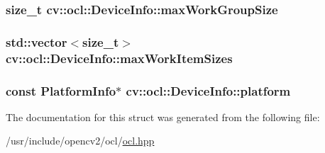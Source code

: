 \hypertarget{structcv_1_1ocl_1_1DeviceInfo_a269ef58aa2c06838ce1b7b1c12ef743f}{
\subsubsection[{max\-Work\-Group\-Size}]{\setlength{\rightskip}{0pt plus 5cm}size\-\_\-t cv\-::ocl\-::\-Device\-Info\-::max\-Work\-Group\-Size}}\label{structcv_1_1ocl_1_1DeviceInfo_a269ef58aa2c06838ce1b7b1c12ef743f}
\hypertarget{structcv_1_1ocl_1_1DeviceInfo_a553c8db901e05768180ce01c504bb99b}{
\subsubsection[{max\-Work\-Item\-Sizes}]{\setlength{\rightskip}{0pt plus 5cm}std\-::vector$<$size\-\_\-t$>$ cv\-::ocl\-::\-Device\-Info\-::max\-Work\-Item\-Sizes}}\label{structcv_1_1ocl_1_1DeviceInfo_a553c8db901e05768180ce01c504bb99b}
\hypertarget{structcv_1_1ocl_1_1DeviceInfo_a14a6fc835e65e05272ea17b9123785ca}{
\subsubsection[{platform}]{\setlength{\rightskip}{0pt plus 5cm}const {\bf Platform\-Info}$\ast$ cv\-::ocl\-::\-Device\-Info\-::platform}}\label{structcv_1_1ocl_1_1DeviceInfo_a14a6fc835e65e05272ea17b9123785ca}


The documentation for this struct was generated from the following file\-:\begin{DoxyCompactItemize}
\item 
/usr/include/opencv2/ocl/\hyperlink{ocl_2ocl_8hpp}{ocl.\-hpp}\end{DoxyCompactItemize}
